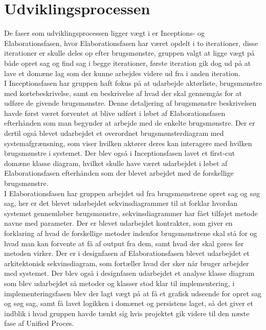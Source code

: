 \section{Udviklingsprocessen}
De faser som udviklingsprocessen ligger vægt i er Inceptions- og Elaborationsfasen, hvor Elaborationsfasen har været opdelt i to iterationer, disse iterationer er skulle deles op efter brugsmønstre, gruppen valgt at ligge vægt på både opret sag og find sag i begge iterationer, første iteration gik dog ud på at lave et domæne lag som der kunne arbejdes videre ud fra i anden iteration.\\
I Inceptionsfasen har gruppen haft fokus på at udarbejde aktørliste, brugsmønstre med kortebeskrivelse, samt en beskrivelse af hvad der skal gennemgås for at udføre de givende brugsmønstre. Denne detaljering af brugsmønstre beskrivelsen havde først været forventet at blive udført i løbet af Elaborationsfasen efterhånden som man begynder at arbejde med de enkelte brugsmønstre. Der er dertil også blevet udarbejdet et overordnet brugsmønsterdiagram med systemafgrænsning, som viser hvilken aktører deres kan interagere med hvilken brugsmønstre i systemet. Der blev også i Inceptionsfasen lavet et first-cut domæne klasse diagram, hvilket skulle have været udarbejdet i løbet af Elaborationsfasen efterhånden som der blevet arbejdet med de forskellige brugsmønstre.\\
I Elaborationsfasen har gruppen arbejdet ud fra brugsmønstrene opret sag og søg sag, her er det blevet udarbejdet sekvinsdiagrammer til at forklar hvordan systemet gennemløber brugsmønstre, sekvinsdiagrammer har fået tilføjet metode navne med parameter. Der er blevet udarbejdet kontrakter, som giver en forklaring af hvad de forskellige metoder indenfor brugsmønstrene skal stå for og hvad man kan forvente at få af output fra dem, samt hvad der skal gøres før metoden virker. Der er i designfasen af Elaborationsfasen blevet udarbejdet et arkitektonisk sekvinsdiagram, som fortæller hvad der sker når bruger arbejder med systemet. Der blev også i designfasen udarbejdet et analyse klasse diagram som blev udarbejdet så metoder og klasser stod klar til implementering, i implementeringsfasen blev der lagt vægt på at få et grafisk udseende for opret sag og søg sag, samt få lavet logikken i domænet og persistens laget, så det giver et indblik i hvad gruppen havde tænkt sig hvis projektet gik videre til den næste fase af Unified Proces.

